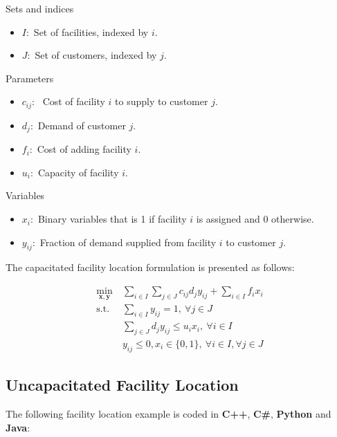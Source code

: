 \documentclass[10pt,bezier]{article}
\begin{document}
\noindent Sets and indices
\begin{itemize}
  \item $I$:~Set of facilities, indexed by $i$.
  \item $J$:~Set of customers, indexed by $j$.
\end{itemize}
Parameters
\begin{itemize}
    \item $c_{ij}$:~ Cost of facility $i$ to supply to customer $j$.
    \item $d_j$:~Demand of customer $j$.
    \item $f_i$:~Cost of adding facility $i$.
    \item $u_i$:~Capacity of facility $i$.
\end{itemize}
Variables
\begin{itemize}
  \item $x_i$:~Binary variables that is 1 if facility $i$ is assigned and 0 otherwise.
  \item $y_{ij}$:~Fraction of demand supplied from facility $i$ to customer $j$.
\end{itemize}

\noindent The capacitated facility location formulation is presented as follows:

\begin{subequations}
    \begin{align}
    \min_{\pmb{x},\pmb{y}}~& \sum_{i \in I} \sum_{ j \in J} c_{ij} d_j y_{ij} + \sum_{i \in I} f_i x_i  \tag{Minimize total cost}\\
    \text{s.t. } & \sum_{i \in I} y_{ij} = 1,~\forall j \in J \tag{2.1a - Satisfied fraction of demand}\\
                 & \sum_{j \in J} d_j y_{ij} \leq u_i x_i,~\forall i \in I \tag{2.1b - Facility capacity}\\
                 & y_{ij} \leq 0, x_i \in \{0,1\},~\forall i \in I, \forall j \in J  \tag{2.1c - Domain}
    \end{align}
\end{subequations}

\newpage
\subsection{Uncapacitated Facility Location}\label{section2.2}
The following facility location example is coded in {\color{blue}\textbf{C++}}, {\color{blue}\textbf{C\#}}, {\color{blue}\textbf{Python}} and {\color{blue}\textbf{Java}}:\\
\end{document}
